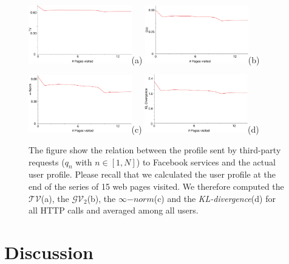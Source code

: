 \begin{figure}

{\includegraphics[width=0.4\textwidth]{figures/facebook-tracking-tags-norm-1.eps}(a)
\includegraphics[width=0.4\textwidth]{figures/facebook-tracking-tags-norm-2.eps}(b)}

{\includegraphics[width=0.4\textwidth]{figures/facebook-tracking-tags-norm-inf.eps}(c)
\includegraphics[width=0.4\textwidth]{figures/facebook-tracking-tags-kl.eps}(d)}

\caption[Profile third-party requests to Facebook]{The figure show the relation between the profile sent by third-party requests ($q_n$ with $n \in [1, N]$) to Facebook services and the actual user profile. Please recall that we calculated the user profile at the end of the series of 15 web pages visited. %
We therefore computed the $\mathcal{TV}$(a), the $\mathcal{GV_2}$(b), the $\infty\mathcal-{norm}$(c) and the \emph{KL-divergence}(d) for all HTTP calls and averaged among all users.
\label{fig:average-facebook-tags-tracker}}%
\end{figure}

\section{Discussion}

